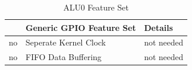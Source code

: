 \begin{table}[H]
\caption{ALU0 Feature Set}
\label{tab:asCoreALU01}
\centering
\begin{tabularx}{\textwidth}{|l |l |X|}
  \hline
   & Generic GPIO Feature Set & Details \\
  \hline
  \hline
  no & Seperate Kernel Clock & not needed \\
  \hline
  no & FIFO Data Buffering & not needed \\
  \hline
\end{tabularx}
\end{table}
